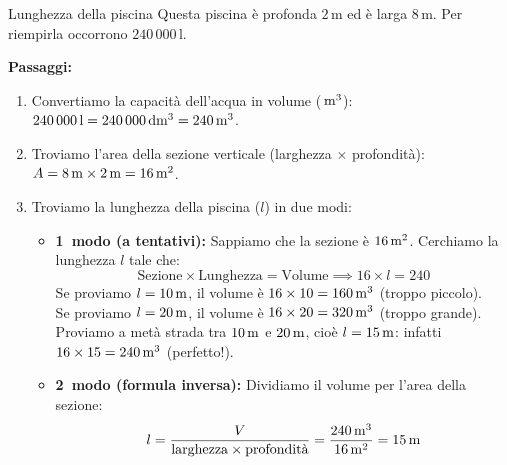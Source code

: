 \begin{esercizio}{Lunghezza della piscina}
Questa piscina è profonda $2\,\mathrm{m}$ ed è larga $8\,\mathrm{m}$. Per riempirla occorrono $240\,000\,\mathrm{l}$.



\responsespace{4.8cm}

\begin{soluzione}
  \textbf{Passaggi:}
  \begin{enumerate}
    \item Convertiamo la capacità dell'acqua in volume ($\,\mathrm{m^3}$): $240\,000\,\mathrm{l} = 240\,000\,\mathrm{dm^3} = 240\,\mathrm{m^3}$.
    \item Troviamo l'area della sezione verticale (larghezza $\times$ profondità): $A = 8\,\mathrm{m} \times 2\,\mathrm{m} = 16\,\mathrm{m^2}$.
    \item Troviamo la lunghezza della piscina ($l$) in due modi:
    \begin{itemize}
      \item \textbf{1\textdegree\ modo (a tentativi):} Sappiamo che la sezione è $16\,\mathrm{m^2}$. Cerchiamo la lunghezza $l$ tale che:
      \[
      \text{Sezione} \times \text{Lunghezza} = \text{Volume} \implies 16 \times l = 240
      \]
      Se proviamo $l = 10\,\mathrm{m}$, il volume è $16 \times 10 = 160\,\mathrm{m^3}$ (troppo piccolo).\\
      Se proviamo $l = 20\,\mathrm{m}$, il volume è $16 \times 20 = 320\,\mathrm{m^3}$ (troppo grande).\\
      Proviamo a metà strada tra $10\,\mathrm{m}$ e $20\,\mathrm{m}$, cioè $l = 15\,\mathrm{m}$: infatti $16 \times 15 = 240\,\mathrm{m^3}$ (perfetto!).
      \item \textbf{2\textdegree\ modo (formula inversa):} Dividiamo il volume per l'area della sezione:
      \[
      l = \frac{V}{\text{larghezza} \times \text{profondità}} = \frac{240\,\mathrm{m^3}}{16\,\mathrm{m^2}} = 15\,\mathrm{m}
      \]
    \end{itemize}
  \end{enumerate}
\end{soluzione}
\end{esercizio}

\condnewpage

